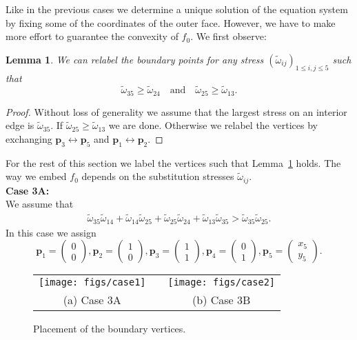 \documentclass{article}
\theoremstyle{plain} \newtheorem{thm}{Theorem}[section]
\newtheorem{lem}{Lemma}[section]
\newcommand{\ot}{\tilde{\omega}}
\begin{document}
Like in the previous cases we determine a unique solution of the equation system
by fixing some of the coordinates of the outer face. 
However, we have to make more effort to guarantee the
convexity of $f_0$. We first observe:
\begin{lem}\label{lem:lemma5gon}
We can relabel the boundary points for any stress $(\ot_{ij})_{1\leq i,j
  \leq 5}$ such that
\[ \ot_{35}  \geq  \ot_{24}  \quad\mbox{and}\quad  \ot_{25}  \geq  \ot_{13}.\]
\end{lem}
\begin{proof}
Without loss of generality we assume that the largest stress on an
interior edge is $\ot_{35}$. If
$\ot_{25}\geq\ot_{13}$ we are done. Otherwise we relabel the vertices by
exchanging $\mathbf{p}_3 \leftrightarrow \mathbf{p}_5$ and
$\mathbf{p}_1 \leftrightarrow \mathbf{p}_2$.
\end{proof}
For the rest of this section we label the vertices such that Lemma~\ref{lem:lemma5gon} holds.
The way we embed  $f_0$ depends on the substitution stresses $\ot_{ij}$.\\[0.5ex]
\textbf{Case 3A:}\\
We assume that
\begin{align}\label{equ:case1}
\ot_{35}\ot_{14}+\ot_{14}\ot_{25}+\ot_{25}\ot_{24}+\ot_{13}\ot_{35}>\ot_{35}\ot_{25}.
\end{align}
In this case we assign
\[
 \mathbf{p}_1= \begin{pmatrix}0 \\  0\end{pmatrix},
 \mathbf{p}_2= \begin{pmatrix}1 \\  0\end{pmatrix},
 \mathbf{p}_3= \begin{pmatrix}1 \\ 1 \end{pmatrix},
 \mathbf{p}_4= \begin{pmatrix}0 \\ 1 \end{pmatrix},
 \mathbf{p}_5= \begin{pmatrix}x_5\\y_5 \end{pmatrix}.
\]
\begin{figure}[ht]
 \center 
 \begin{tabular}{cp{1cm}c}
   \texttt{[image: figs/case1]} & &
   \texttt{[image: figs/case2]} \\
  (a) Case 3A &&  (b) Case 3B 
 \end{tabular}
    \caption{Placement of the boundary vertices.}
    \label{fig:placement}
\end{figure}
\end{document}
